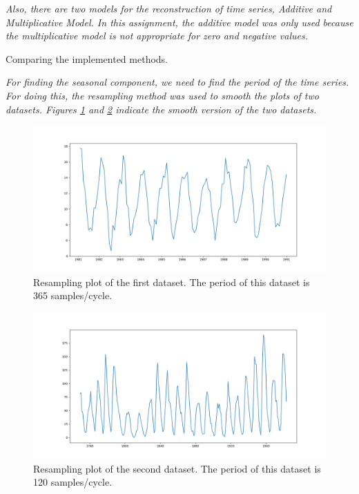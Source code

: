 \textit{Also, there are two models for the reconstruction of time series, Additive and Multiplicative Model. In this assignment, the additive model was only used because the multiplicative model is not appropriate for zero and negative values.}

\begin{table}[H]
\centering
\caption{Comparing the implemented methods.}
\label{tab:Ass1_comparing_methods}

\end{table}


\textit{For finding the seasonal component, we need to find the period of the time series. For doing this, the resampling method was used to smooth the plots of two datasets. Figures \ref{fig:Ass1_D1_resample} and \ref{fig:Ass1_D2_resample} indicate the smooth version of the two datasets. }

\begin{figure}[H]
    \centering
    \begin{minipage}[b]{1\textwidth}
        \includegraphics[width=\textwidth]{figures/Ass1/Ass1_D1_resample.png}
    \end{minipage}
    \caption{Resampling plot of the first dataset. The period of this dataset is 365 samples/cycle. }
    \label{fig:Ass1_D1_resample}
\end{figure}

\begin{figure}[H]
    \centering
    \begin{minipage}[b]{1\textwidth}
        \includegraphics[width=\textwidth]{figures/Ass1/Ass1_D2_resample.png}
    \end{minipage}
    \caption{Resampling plot of the second dataset. The period of this dataset is 120 samples/cycle.}
    \label{fig:Ass1_D2_resample}
\end{figure}


